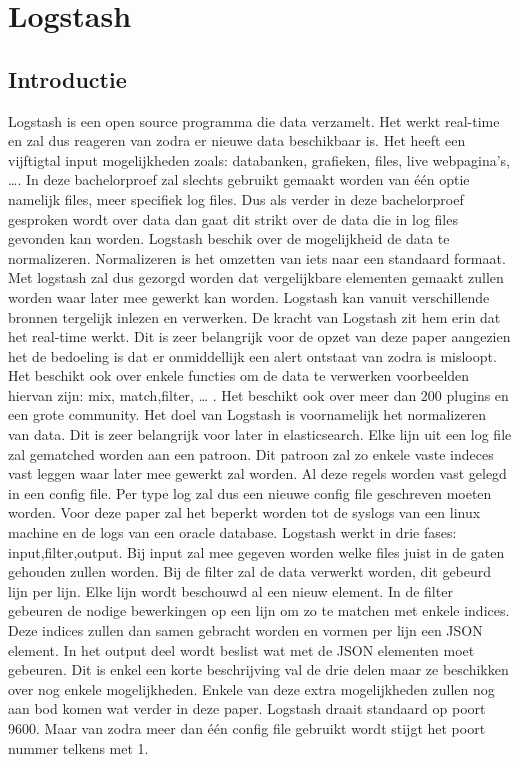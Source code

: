 
\chapter{Logstash}
\label{ch:logstash}


\section{Introductie}
\label{sec:logstash-introductie}

Logstash is een open source programma die data verzamelt. Het werkt real-time en zal dus reageren van zodra er nieuwe data beschikbaar is. Het heeft een vijftigtal input mogelijkheden zoals: databanken, grafieken, files, live webpagina's, \dots. In deze bachelorproef zal slechts gebruikt gemaakt worden van één optie namelijk files, meer specifiek log files. Dus als verder in deze bachelorproef gesproken wordt over data dan gaat dit strikt over de data die in log files gevonden kan worden.
Logstash beschik over de mogelijkheid de data te normalizeren. Normalizeren is het omzetten van iets naar een standaard formaat. Met logstash zal dus gezorgd worden dat vergelijkbare elementen gemaakt zullen worden waar later mee gewerkt kan worden.
Logstash kan vanuit verschillende bronnen tergelijk inlezen en verwerken. 
De kracht van Logstash zit hem erin dat het real-time werkt. Dit is zeer belangrijk voor de opzet van deze paper aangezien het de bedoeling is dat er onmiddellijk een alert ontstaat van zodra is misloopt. Het beschikt ook over enkele functies om de data te verwerken voorbeelden hiervan zijn: mix, match,filter, … .  
Het beschikt ook over meer dan 200 plugins en een grote community.
Het doel van Logstash is voornamelijk het normalizeren van data. Dit is zeer belangrijk voor later in elasticsearch. Elke lijn uit een log file zal gematched worden aan een patroon. Dit patroon zal zo enkele vaste indeces vast leggen waar later mee gewerkt zal worden.
Al deze regels worden vast gelegd in een config file. Per type log zal dus een nieuwe config file geschreven moeten worden. Voor deze paper zal het beperkt worden tot de syslogs van een linux machine en de logs van een oracle database.
Logstash werkt in drie fases: input,filter,output. Bij input zal mee gegeven worden welke files juist in de gaten gehouden zullen worden. Bij de filter zal de data verwerkt worden, dit gebeurd lijn per lijn. Elke lijn wordt beschouwd al een nieuw element. In de filter gebeuren de nodige bewerkingen op een lijn om zo te matchen met enkele indices. Deze indices zullen dan samen gebracht worden en vormen per lijn een JSON element. In het output deel wordt beslist wat met de JSON elementen moet gebeuren.  
Dit is enkel een korte beschrijving val de drie delen maar ze beschikken over nog enkele mogelijkheden. Enkele van deze extra mogelijkheden zullen nog aan bod komen wat verder in deze paper. 
Logstash draait standaard op poort 9600. Maar van zodra meer dan één config file gebruikt wordt stijgt het poort nummer telkens met 1. 



